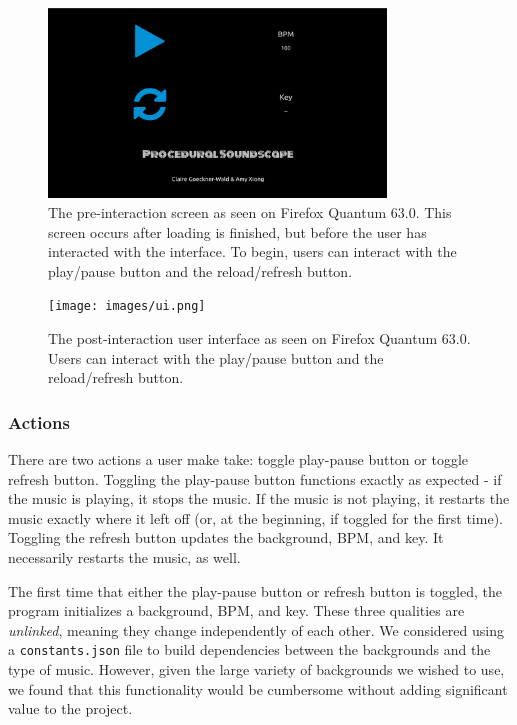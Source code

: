 \documentclass[12pt,a4paper]{article}
\newcommand{\lightcode}[1]{\colorbox{light-gray}{\texttt{#1}}}
\begin{document}
\begin{figure}
\centering\includegraphics[width=0.8\textwidth]{images/loaded.png}
\caption{The pre-interaction screen as seen on Firefox Quantum 63.0. This screen occurs after loading is finished, but before the user has interacted with the interface. To begin, users can interact with the play/pause button and the reload/refresh button.}
\end{figure}

\begin{figure}
\centering\texttt{[image: images/ui.png]}
\caption{The post-interaction user interface as seen on Firefox Quantum 63.0. Users can interact with the play/pause button and the reload/refresh button.}
\end{figure}

\subsubsection{Actions}

There are two actions a user make take: toggle play-pause button or toggle refresh button. Toggling the play-pause button functions exactly as expected - if the music is playing, it stops the music. If the music is not playing, it restarts the music exactly where it left off (or, at the beginning, if toggled for the first time). Toggling the refresh button updates the background, BPM, and key. It necessarily restarts the music, as well.

The first time that either the play-pause button or refresh button is toggled, the program initializes a background, BPM, and key. These three qualities are \textit{unlinked}, meaning they change independently of each other. We considered using a \lightcode{constants.json} file to build dependencies between the backgrounds and the type of music. However, given the large variety of backgrounds we wished to use, we found that this functionality would be cumbersome without adding significant value to the project. 
\end{document}
